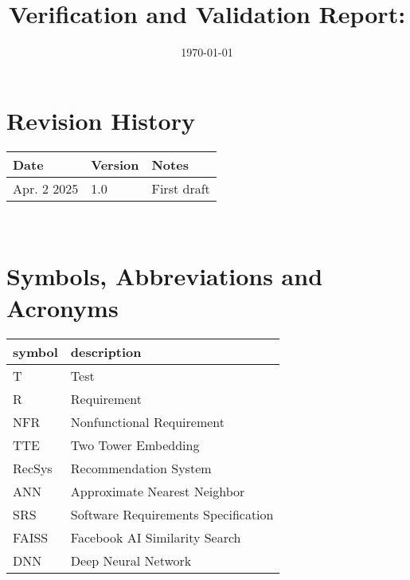 \documentclass[12pt, titlepage]{article}
\begin{document}
\title{Verification and Validation Report: \progname} 
\author{\authname}
\date{\today}
	
\maketitle


\section{Revision History}

\begin{tabularx}{\textwidth}{p{3cm}p{2cm}X}
\toprule {\bf Date} & {\bf Version} & {\bf Notes}\\
\midrule
Apr. 2 2025 & 1.0 & First draft\\
\bottomrule
\end{tabularx}
\nocite{*}
~\newpage

\section{Symbols, Abbreviations and Acronyms}

\renewcommand{\arraystretch}{1.2}
\begin{tabular}{l l} 
  \toprule		
  \textbf{symbol} & \textbf{description}\\
  \midrule 
  T & Test\\
  R & Requirement\\
  NFR & Nonfunctional Requirement\\
  TTE & Two Tower Embedding\\
  RecSys & Recommendation System\\
  ANN & Approximate Nearest Neighbor\\
  SRS & Software Requirements Specification\\
  FAISS & Facebook AI Similarity Search\\
  DNN & Deep Neural Network\\
  \bottomrule
\end{tabular}\\


\newpage

\tableofcontents

\listoftables %

\listoffigures %

\newpage

\end{document}
